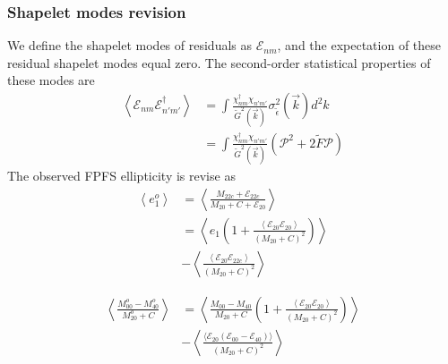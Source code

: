 \subsubsection{Shapelet modes revision}
We define the shapelet modes of residuals as $\mathcal{E}_{nm}$, and the
expectation of these residual shapelet modes equal zero. The second-order
statistical properties of these modes are
\begin{equation}
    \begin{split}
    \left\langle \mathcal{E}_{nm}\mathcal{E}^{\dagger}_{n'm'} \right\rangle
    &=\int \frac{\chi^\dagger_{nm}\chi_{n'm'}}{\tilde{G}^2(\vec{k})}
    \sigma^2_{\tilde{\epsilon}}(\vec{k})d^2k\\
    &=\int \frac{\chi^\dagger_{nm}\chi_{n'm'}}{\tilde{G}^2(\vec{k})}
    \left(\mathcal{P}^2+2\tilde{F}\mathcal{P}\right)
    \end{split}
\end{equation}
The observed FPFS ellipticity is revise as
\begin{equation}
    \begin{split}
    \left\langle e^o_1\right\rangle
    &=\left\langle\frac{M_{22c}+\mathcal{E}_{22c}}
        {M_{20}+C+\mathcal{E}_{20}}\right\rangle\\
    &=\left\langle
        e_1\left(1+
        \frac{\left\langle\mathcal{E}_{20}\mathcal{E}_{20}\right\rangle}
        {(M_{20}+C)^2}\right)
        \right\rangle\\
    &-\left\langle
    \frac{\left\langle\mathcal{E}_{20}\mathcal{E}_{22c}\right\rangle}
        {(M_{20}+C)^2}
    \right\rangle
    \end{split}
\end{equation}

\begin{equation}
    \begin{split}
    \left\langle \frac{M^o_{00}-M^o_{40}}{M^o_{20}+C}\right\rangle
    &=\left\langle
        \frac{M_{00}-M_{40}}{M_{20}+C}\left(1+
        \frac{\left\langle\mathcal{E}_{20}\mathcal{E}_{20}\right\rangle}
        {(M_{20}+C)^2}\right)
        \right\rangle\\
    &-\left\langle
    \frac{\langle\mathcal{E}_{20}
    (\mathcal{E}_{00}-\mathcal{E}_{40})\rangle}
    {(M_{20}+C)^2}
    \right\rangle
    \end{split}
\end{equation}

